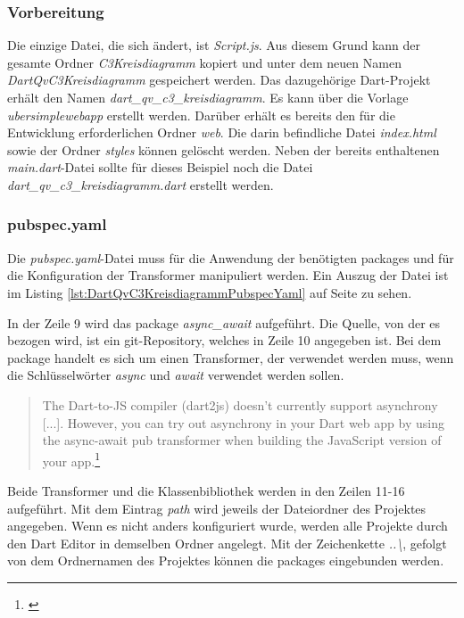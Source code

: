 \subsubsection{Vorbereitung}
\label{lab:LeitfadenZurErstellungEinesQlikViewExtensionObjectsMitDartVorbereitung} 

Die einzige Datei, die sich ändert, ist \textit{Script.js}. Aus diesem Grund kann der gesamte Ordner \textit{C3Kreisdiagramm} kopiert und unter dem neuen Namen \textit{DartQvC3Kreisdiagramm} gespeichert werden. Das dazugehörige Dart-Projekt erhält den Namen \textit{dart\_qv\_c3\_kreisdiagramm}. Es kann über die Vorlage \textit{ubersimplewebapp} erstellt werden. Darüber erhält es bereits den für die Entwicklung erforderlichen Ordner \textit{web}. Die darin befindliche Datei \textit{index.html} sowie der Ordner \textit{styles} können gelöscht werden. Neben der bereits enthaltenen \textit{main.dart}-Datei sollte für dieses Beispiel noch die Datei \textit{dart\_qv\_c3\_kreisdiagramm.dart} erstellt werden.


\subsubsection{pubspec.yaml}
\label{lab:LeitfadenZurErstellungEinesQlikViewExtensionObjectsMitDartPubspecYaml} 

Die \textit{pubspec.yaml}-Datei muss für die Anwendung der benötigten packages und für die Konfiguration der Transformer manipuliert werden. Ein Auszug der Datei ist im Listing \ref{lst:DartQvC3KreisdiagrammPubspecYaml} auf Seite \pageref{lst:DartQvC3KreisdiagrammPubspecYaml} zu sehen.

In der Zeile 9 wird das package \textit{async\_await} aufgeführt. Die Quelle, von der es bezogen wird, ist ein git-Repository, welches in Zeile 10 angegeben ist. Bei dem package handelt es sich um einen Transformer, der verwendet werden muss, wenn die Schlüsselwörter \textit{async} und \textit{await} verwendet werden sollen.
\begin{quote}
The Dart-to-JS compiler (dart2js) doesn’t currently support asynchrony [...]. However, you can try out asynchrony in your Dart web app by using the async-await pub transformer when building the JavaScript version of your app.\footnote{\cite{ Asynchrony}}
\end{quote}

Beide Transformer und die Klassen\-bibliothek werden in den Zeilen 11-16 aufgeführt. Mit dem Eintrag \textit{path} wird jeweils der Dateiordner des Projektes angegeben. Wenn es nicht anders konfiguriert wurde, werden alle Projekte durch den Dart Editor in demselben Ordner angelegt. Mit der Zeichenkette \textit{..\textbackslash}, gefolgt von dem Ordnernamen des Projektes können die packages eingebunden werden.


